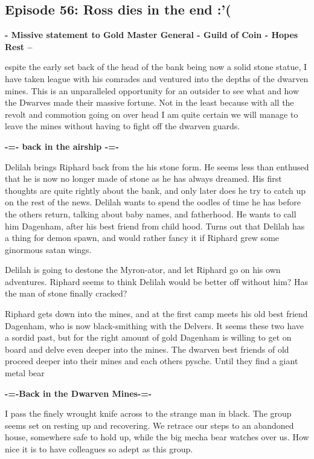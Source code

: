 \subsection{Episode 56: Ross dies in the end :'(}

\textbf{- Missive statement to Gold Master General - Guild of Coin - Hopes Rest --}\medskip

espite the early set back of the head of the bank being now a solid stone statue, I have taken league with his comrades and ventured into the depths of the dwarven mines. This is an unparalleled opportunity for an outsider to see what and how the Dwarves made their massive fortune. Not in the least because with all the revolt and commotion going on over head I am quite certain we will manage to leave the mines without having to fight off the dwarven guards.\medskip

\textbf{-=- back in the airship -=-}\medskip

Delilah brings Riphard back from the his stone form. He seems less than enthused that he is now no longer made of stone as he has always dreamed. His first thoughts are quite rightly about the bank, and only later does he try to catch up on the rest of the news. Delilah wants to spend the oodles of time he has before the others return, talking about baby names, and fatherhood. He wants to call him Dagenham, after his best friend from child hood. Turns out that Delilah has a thing for demon spawn, and would rather fancy it if Riphard grew some ginormous satan wings.\medskip

Delilah is going to destone the Myron-ator, and let Riphard go on his own adventures. Riphard seems to think Delilah would be better off without him? Has the man of stone finally cracked?\medskip

Riphard gets down into the mines, and at the first camp meets his old best friend Dagenham, who is now black-smithing with the Delvers. It seems these two have a sordid past, but for the right amount of gold Dagenham is willing to get on board and delve even deeper into the mines. The dwarven best friends of old proceed deeper into their mines and each others pysche. Until they find a giant metal bear\medskip

\textbf{-=-Back in the Dwarven Mines-=-}\medskip

I pass the finely wrought knife across to the strange man in black. The group seems set on resting up and recovering. We retrace our steps to an abandoned house, somewhere safe to hold up, while the big mecha bear watches over us. How nice it is to have colleagues so adept as this group.\medskip

